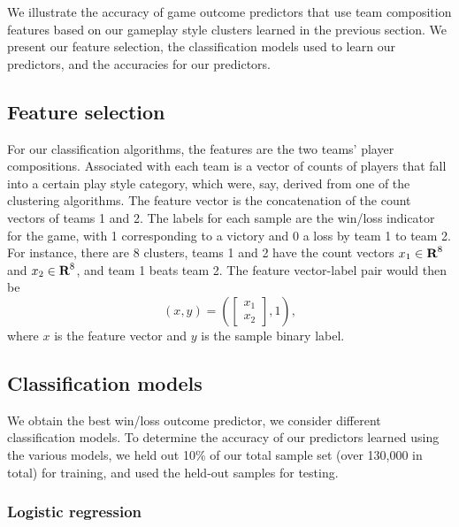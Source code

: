 \documentclass[letterpaper,10 pt,conference]{ieeeconf}
\begin{document}
We illustrate the accuracy of game outcome predictors that use team composition features based on our gameplay style clusters learned in the previous section. We present our feature selection, the classification models used to learn our predictors, and the accuracies for our predictors. 

\subsection{Feature selection}

For our classification algorithms, the features are the two teams' player compositions. Associated with each team is a vector of counts of players that fall into a certain play style category, which were, say, derived from one of the clustering algorithms. The feature vector is the concatenation of the count vectors of teams 1 and 2. The labels for each sample are the win/loss indicator for the game, with 1 corresponding to a victory and 0 a loss by team 1 to team 2. For instance, there are 8 clusters, teams 1 and 2 have the count vectors $x_{1}\in{\mbox{\bf R}}^{8}$ and $x_{2}\in{\mbox{\bf R}}^{8}$, and team 1 beats team 2. The feature vector-label pair would then be 
\[
  \left(x, y\right) = 
  \left(
    \left[
      \begin{array}{c}
        x_{1} \\ 
        x_{2}
      \end{array}
    \right],
    1
  \right),
\]
where $x$ is the feature vector and $y$ is the sample binary label.

\subsection{Classification models}

We obtain the best win/loss outcome predictor, we consider different classification models. To determine the accuracy of our predictors learned using the various models, we held out 10\% of our total sample set (over 130,000 in total) for training, and used the held-out samples for testing. 

\subsubsection{Logistic regression}
\end{document}
